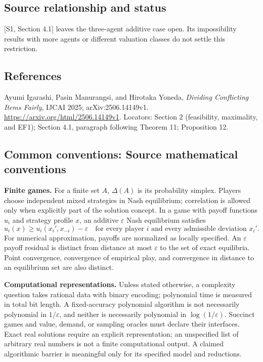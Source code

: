 \documentclass[11pt,a4paper]{article}
\begin{document}
\subsection*{Source relationship and status}
[S1, Section 4.1] leaves the three-agent additive case open.
Its impossibility results with more agents or different valuation
classes do not settle this restriction.

\subsection*{References}
\begingroup\footnotesize\raggedright
\noindent[S1] Ayumi Igarashi, Pasin Manurangsi, and Hirotaka Yoneda,
\emph{Dividing Conflicting Items Fairly}, IJCAI 2025;
arXiv:2506.14149v1.
\url{https://arxiv.org/html/2506.14149v1}.
Locators: Section 2 (feasibility, maximality, and EF1);
Section 4.1, paragraph following Theorem 11; Proposition 12.
\par\endgroup

\subsection*{Common conventions: Source mathematical conventions}

\textbf{Finite games.} For a finite set $A$, $\Delta(A)$ is its probability
simplex. Players choose independent mixed strategies in Nash equilibrium;
correlation is allowed only when explicitly part of the solution concept.
In a game with payoff functions $u_i$ and strategy profile $x$, an additive
$\varepsilon$ Nash equilibrium satisfies
\[
 u_i(x)\geq u_i(x_i',x_{-i})-\varepsilon
 \quad\text{for every player $i$ and every admissible deviation $x_i'$}.
\]
For numerical approximation, payoffs are normalized as locally specified.
An $\varepsilon$ payoff residual is distinct from distance at most
$\varepsilon$ to the set of exact equilibria. Point convergence, convergence
of empirical play, and convergence in distance to an equilibrium set are
also distinct.

\textbf{Computational representations.} Unless stated otherwise, a complexity
question takes rational data with binary encoding; polynomial time is measured
in total bit length. A fixed-accuracy polynomial algorithm is not necessarily
polynomial in $1/\varepsilon$, and neither is necessarily polynomial in
$\log(1/\varepsilon)$. Succinct games and value, demand, or sampling oracles
must declare their interfaces. Exact real solutions require an explicit
representation; an unspecified list of arbitrary real numbers is not a
finite computational output. A claimed algorithmic barrier is meaningful
only for its specified model and reductions.
\end{document}
